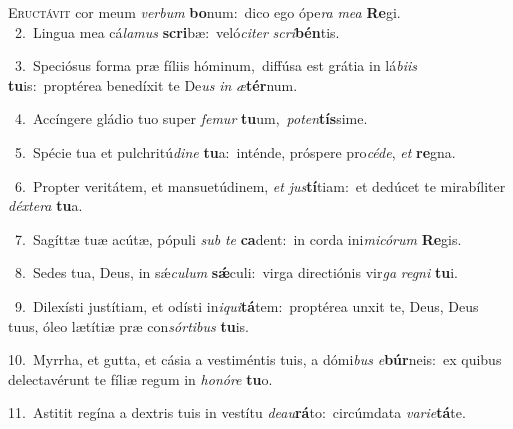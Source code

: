 \lettrine{\initial\textcolor{\initialcolor}{E}}{ructávit} cor meum \textit{ver}\-\textit{bum} \textbf{bo}\-num:~\star dico ego ópe\textit{ra} \textit{me}\-\textit{a} \textbf{Re}\-gi.\\
{\numbfont\textcolor{\numbcolor}{~2.}}~Lingua mea cá\-\textit{la}\-\textit{mus} \textbf{scri}\-bæ:~\star veló\-\textit{ci}\-\textit{ter} \textit{scri}\-\textbf{bén}tis.\par
{\numbfont\textcolor{\numbcolor}{~3.}}~Speciósus forma præ fíliis hóminum,~\dagger diffúsa est grátia in lá\-\textit{bi}\-\textit{is} \textbf{tu}\-is:~\star proptérea benedíxit te De\textit{us} \textit{in} \textit{æ}\-\textbf{tér}num.\par
{\numbfont\textcolor{\numbcolor}{~4.}}~Accíngere gládio tuo super \textit{fe}\-\textit{mur} \textbf{tu}\-um,~\star \textit{pot}\-\textit{en}\textbf{tís}sime.\par
{\numbfont\textcolor{\numbcolor}{~5.}}~Spécie tua et pulchritú\-\textit{di}\-\textit{ne} \textbf{tu}\-a:~\star inténde, próspere pro\-\textit{cé}\-\textit{de}, \textit{et} \textbf{re}\-gna.\par
{\numbfont\textcolor{\numbcolor}{~6.}}~Propter veritátem, et mansuetúdinem, \textit{et} \textit{jus}\-\textbf{tí}tiam:~\star et dedúcet te mirabíliter \textit{déx}\-\textit{te}\textit{ra} \textbf{tu}\-a.\par
{\numbfont\textcolor{\numbcolor}{~7.}}~Sagíttæ tuæ acútæ, pópuli \textit{sub} \textit{te} \textbf{ca}\-dent:~\star in corda ini\-\textit{mi}\-\textit{có}\textit{rum} \textbf{Re}\-gis.\par
{\numbfont\textcolor{\numbcolor}{~8.}}~Sedes tua, Deus, in sǽ\-\textit{cu}\-\textit{lum} \textbf{sǽ}\-culi:~\star virga directiónis vir\textit{ga} \textit{re}\-\textit{gni} \textbf{tu}\-i.\par
{\numbfont\textcolor{\numbcolor}{~9.}}~Dilexísti justítiam, et odísti in\-\textit{i}\-\textit{qui}\textbf{tá}tem:~\star proptérea unxit te, Deus, Deus tuus, óleo lætítiæ præ con\-\textit{sór}\-\textit{ti}\textit{bus} \textbf{tu}\-is.\par
{\numbfont\textcolor{\numbcolor}{10.}}~Myrrha, et gutta, et cásia a vestiméntis tuis, a dómi\textit{bus} \textit{e}\-\textbf{búr}neis:~\star ex quibus delectavérunt te fíliæ regum in \textit{ho}\-\textit{nó}\textit{re} \textbf{tu}\-o.\par
{\numbfont\textcolor{\numbcolor}{11.}}~Astitit regína a dextris tuis in vestítu \textit{de}\-\textit{au}\textbf{rá}to:~\star circúmdata \textit{va}\-\textit{ri}\textit{e}\textbf{tá}te.\par
